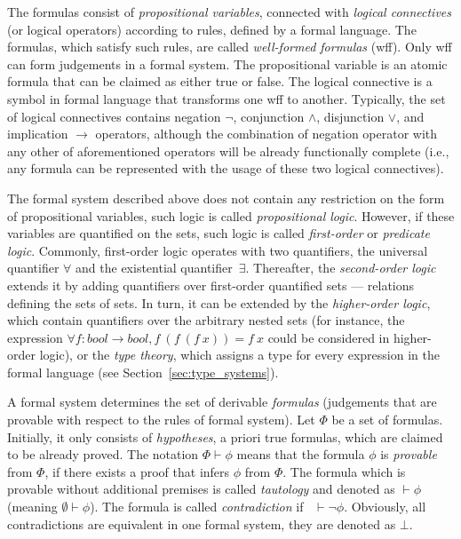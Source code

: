 \documentclass[article]{aaltoseries}
\begin{document}
The formulas consist of \textit{propositional variables}, connected with \textit{logical connectives} (or logical operators) according to rules, defined by a formal language. The formulas, which satisfy such rules, are called \textit{well-formed formulas} (wff). Only wff can form judgements in a formal system. The propositional variable is an atomic formula that can be claimed as either true or false. The logical connective is a symbol in formal language that transforms one wff to another. Typically, the set of logical connectives contains negation $\neg$, conjunction $\land$, disjunction $\lor$, and implication $\rightarrow$ operators, although the combination of negation operator with any other of aforementioned operators will be already functionally complete (i.e., any formula can be represented with the usage of these two logical connectives).

The formal system described above does not contain any restriction on the form of propositional variables, such logic is called \textit{propositional logic}. However, if these variables are quantified on the sets, such logic is called \textit{first-order} or \textit{predicate logic}. Commonly, first-order logic operates with two quantifiers, the universal quantifier $\forall$ and the existential quantifier~$\exists$. Thereafter, the \textit{second-order logic} extends it by adding quantifiers over first-order quantified sets --- relations defining the sets of sets. In turn, it can be extended by the \textit{higher-order logic}, which contain quantifiers over the arbitrary nested sets (for instance, the expression $\forall f: bool \rightarrow bool, f\ (f\ (f\ x)) = f\ x$ could be considered in higher-order logic), or the \textit{type theory}, which assigns a type for every expression in the formal language (see Section~\ref{sec:type_systems}).

A formal system determines the set of derivable \textit{formulas} (judgements that are provable with respect to the rules of formal system). Let $\Phi$ be a set of formulas. Initially, it only consists of \textit{hypotheses}, a priori true formulas, which are claimed to be already proved. The notation $\Phi \vdash \phi$ means that the formula $\phi$ is \textit{provable} from $\Phi$, if there exists a proof that infers $\phi$ from $\Phi$. The formula which is provable without additional premises is called \textit{tautology} and denoted as $ \vdash \phi $ (meaning $\emptyset \vdash \phi$). The formula is called \textit{contradiction} if \ $\vdash \neg \phi$. Obviously, all contradictions are equivalent in one formal system, they are denoted as $\bot$.
\end{document}
